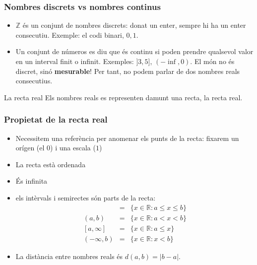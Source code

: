 \documentclass{beamer}
\begin{document}
\begin{frame}
\frametitle{Nombres discrets vs nombres continus}
\begin{itemize}
\item $\mathbb{Z}$ és un conjunt de nombres discrets: donat un enter, sempre hi ha un enter consecutiu. Exemple: el codi binari, ${0,1}$.
\item Un conjunt de números es diu que és continu si poden prendre qualsevol valor en un interval finit o infinit. Exemples: $]3,5]$, $(-\inf,0)$. El món no és discret, sinó {\bf mesurable}! Per tant, no podem parlar de dos nombres reals consecutius.
\end{itemize}
\begin{exampleblock}{La recta real}
  Els nombres reals es representen damunt una recta, la recta real.
\end{exampleblock}
\end{frame}

\begin{frame}
\frametitle{Propietat de la recta real}
\begin{itemize}
\item Necessitem una referència per anomenar els punts de la recta: fixarem un orígen (el $0$) i una escala ($1$)
\item La recta està ordenada
\item És infinita
\item els intèrvals i semirectes són parts de la recta:
  \begin{eqnarray}
    [a,b] &=& \{x \in \mathbb{R}: a \leq x \leq b\} \nonumber \\
    (a,b) &=& \{x \in \mathbb{R}: a < x < b\} \nonumber \\
    \left[a,\infty\right] &=& \{x \in \mathbb{R}: a \leq x\} \nonumber \\
    (-\infty, b) &=& \{x\in \mathbb{R}:x<b\}
  \end{eqnarray}
\item La distància entre nombres reals és $d(a,b) = |b-a|$.
\end{itemize}
\end{frame}
\end{document}

